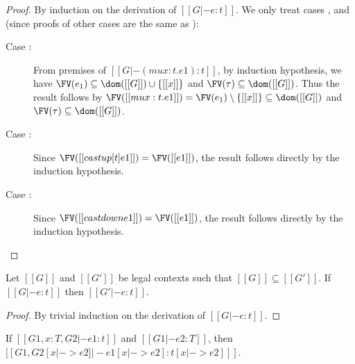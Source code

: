 \begin{proof}
    By induction on the derivation of $[[G |- e:t]]$. We only treat cases
,  and  (since proofs of
other cases are the same as \cc \cite{handbook}):
    \begin{description}
        \item[Case :] From premises of $[[G |- (mu x:t.e1) :
t]]$, by induction hypothesis, we have $\FV(e_1) \subseteq \dom([[G]]) \cup
\{[[x]]\}$ and $\FV(\tau) \subseteq \dom([[G]])$. Thus the result follows by
$\FV([[mu x:t.e1]])=\FV(e_1) \setminus \{[[x]]\} \subseteq \dom([[G]])$ and
$\FV(\tau) \subseteq \dom([[G]])$.
        \item[Case :] Since $\FV([[castup [t]
e1]])=\FV([[e1]])$, the result follows directly by the induction hypothesis.
        \item[Case :] Since $\FV([[castdown
e1]])=\FV([[e1]])$, the result follows directly by the induction hypothesis.
    \end{description}
\end{proof}

\begin{lem}[Thinning]\label{lem:appendix:thin}
    Let $[[G]]$ and $[[G']]$ be legal contexts such that $[[G]] \subseteq
[[G']]$. If $[[G |- e : t]]$ then $[[G' |- e : t]]$.
\end{lem}

\begin{proof}
    By trivial induction on the derivation of $[[G |- e : t]]$.
\end{proof}

\begin{lem}[Substitution]\label{lem:appendix:subst}
	If $[[G1, x:T, G2 |- e1:t]]$ and $[[G1 |- e2:T]]$, then $[[G1, G2 [x |-> e2]
|- e1[x |-> e2]  : t[x |-> e2] ]]$.
\end{lem}

